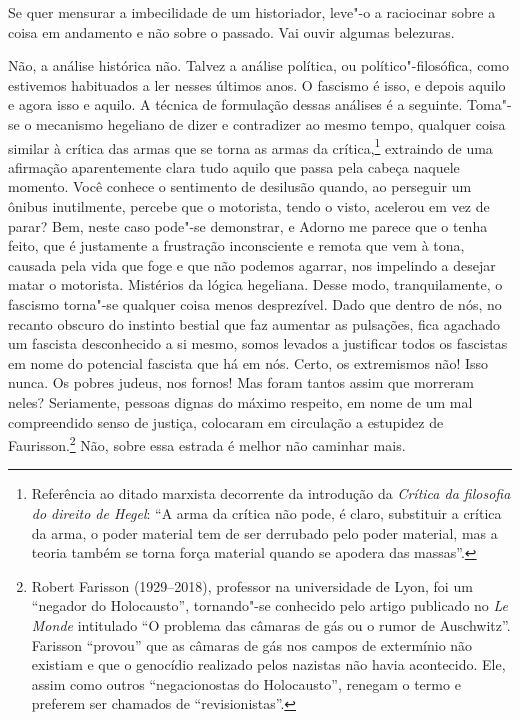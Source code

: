 Se quer mensurar a imbecilidade de um historiador, leve"-o a raciocinar
sobre a coisa em andamento e não sobre o passado. Vai ouvir algumas
belezuras.

Não, a análise histórica não. Talvez a análise política, ou
político"-filosófica, como estivemos habituados a ler nesses últimos
anos. O fascismo é isso, e depois aquilo e agora isso e aquilo. A
técnica de formulação dessas análises é a seguinte. Toma"-se o mecanismo
hegeliano de dizer e contradizer ao mesmo tempo, qualquer coisa similar
à crítica das armas que se torna as armas da crítica,\footnote{Referência ao ditado marxista decorrente da introdução da
  \emph{Crítica da filosofia do direito de Hegel}: ``A arma da crítica
  não pode, é claro, substituir a crítica da arma, o poder material tem
  de ser derrubado pelo poder material, mas a teoria também se torna
  força material quando se apodera das massas''.} extraindo de uma afirmação aparentemente clara tudo
aquilo que passa pela cabeça naquele momento. Você conhece o sentimento
de desilusão quando, ao perseguir um ônibus inutilmente, percebe que o
motorista, tendo o visto, acelerou em vez de parar? Bem, neste caso
pode"-se demonstrar, e Adorno me parece que o tenha feito, que é
justamente a frustração inconsciente e remota que vem à tona, causada
pela vida que foge e que não podemos agarrar, nos impelindo a desejar
matar o motorista. Mistérios da lógica hegeliana. Desse modo,
tranquilamente, o fascismo torna"-se qualquer coisa menos desprezível.
Dado que dentro de nós, no recanto obscuro do instinto bestial que faz
aumentar as pulsações, fica agachado um fascista desconhecido a si
mesmo, somos levados a justificar todos os fascistas em nome do
potencial fascista que há em nós. Certo, os extremismos não! Isso nunca.
Os pobres judeus, nos fornos! Mas foram tantos assim que morreram neles?
Seriamente, pessoas dignas do máximo respeito, em nome de um mal
compreendido senso de justiça, colocaram em circulação a estupidez de
Faurisson.\footnote{Robert Farisson (1929--2018), professor na universidade de Lyon, foi
  um ``negador do Holocausto'', tornando"-se conhecido pelo artigo
  publicado no \emph{Le Monde} intitulado ``O problema das câmaras de
  gás ou o rumor de Auschwitz''. Farisson ``provou'' que as câmaras de
  gás nos campos de extermínio não existiam e que o genocídio realizado
  pelos nazistas não havia acontecido. Ele, assim como outros
  ``negacionostas do Holocausto'', renegam o termo e preferem ser
  chamados de ``revisionistas''.} Não, sobre essa estrada é melhor não caminhar mais.

